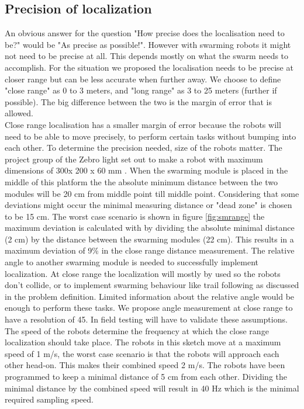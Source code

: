 \documentclass[10pt,a4paper]{article}
\begin{document}
\subsection{Precision of localization}
An obvious answer for the question "How precise does the localisation need to be?" would be "As precise as possible!". However with swarming robots it might not need to be precise at all. This depends mostly on what the swarm needs to accomplish. For the situation we proposed the localisation needs to be precise at closer range but can be less accurate when further away. We choose to define "close range" as 0 to 3 meters, and "long range" as 3 to 25 meters (further if possible).  The big difference between the two is the margin of error that is allowed. \\

Close range localisation has a smaller margin of error because the robots will need to be able to move precisely, to perform certain tasks without bumping into each other. To determine the precision needed, size of the robots matter.  The project group of the Zebro light set out to make a robot with maximum dimensions of  300x 200 x 60 mm \cite{zebrolight}. When the swarming module is placed in the middle of this platform the the absolute minimum distance between the two modules will be 20 cm from middle point till middle point. Considering that some deviations might occur the minimal measuring distance or "dead zone" is chosen to be 15 cm. The worst case scenario is shown in figure \ref{fig:smrange} the maximum deviation is calculated with by dividing the absolute minimal distance (2 cm) by the distance between the swarming modules (22 cm). This results in a maximum deviation of 9\% in the close range distance measurement. The relative angle to another swarming module is needed to successfully implement localization. At close range the localization will mostly by used so the robots don't collide, or to implement swarming behaviour like trail following as discussed in the problem definition. Limited information about the relative angle would be enough to perform these tasks. We propose angle measurement at close range to have a resolution of 45\degree. In field testing will have to validate these assumptions. The speed of the robots determine the frequency at which the close range localization should take place. The robots in this sketch move at a maximum speed of 1 m/s, the worst case scenario is that the robots will approach each other head-on. This makes their combined speed 2 m/s. The robots have been programmed to keep a minimal distance of 5 cm from each other. Dividing the minimal distance by the combined speed will result in 40 Hz which is the minimal required sampling speed. \\
\end{document}
